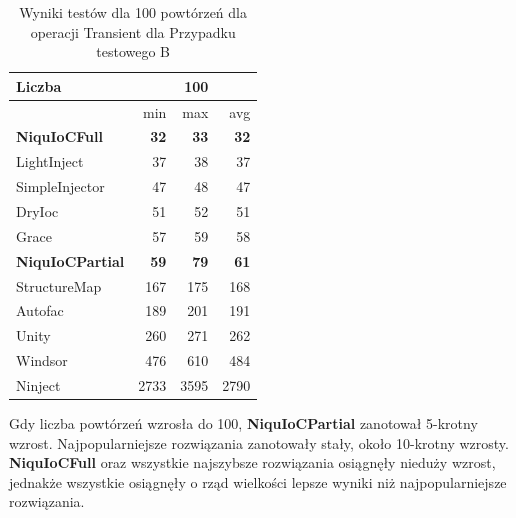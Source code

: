 \documentclass[12pt]{article}
\begin{document}
\begin{table}[H]
\captionsetup{belowskip=0pt,aboveskip=0pt}
\begin{center}
\begin{small}
	\begin{tabular}{ | l | r r r | }
    		\hline
Liczba & & 100 & \\ \hline
 & min & max & avg \\ \hline
\textbf{NiquIoCFull} & \textbf{32} & \textbf{33} & \textbf{32} \\ \hline
LightInject & 37 & 38 & 37 \\ \hline
SimpleInjector & 47 & 48 & 47 \\ \hline
DryIoc & 51 & 52 & 51 \\ \hline
Grace & 57 & 59 & 58 \\ \hline
\textbf{NiquIoCPartial} & \textbf{59} & \textbf{79} & \textbf{61} \\ \hline
StructureMap & 167 & 175 & 168 \\ \hline
Autofac & 189 & 201 & 191 \\ \hline
Unity & 260 & 271 & 262 \\ \hline
Windsor & 476 & 610 & 484 \\ \hline
Ninject & 2733 & 3595 & 2790 \\ \hline
  	\end{tabular}
\end{small}
\end{center}
\caption{Wyniki testów dla 100 powtórzeń dla operacji Transient dla Przypadku testowego B}
\label{TestCaseB_Transient100}
\end{table}
Gdy liczba powtórzeń wzrosła do 100, \textbf{NiquIoCPartial} zanotował 5-krotny wzrost. Najpopularniejsze rozwiązania zanotowały stały, około 10-krotny wzrosty. \textbf{NiquIoCFull} oraz wszystkie najszybsze rozwiązania osiągnęły nieduży wzrost, jednakże wszystkie osiągnęły o rząd wielkości lepsze wyniki niż najpopularniejsze rozwiązania.
\\ \\
\end{document}
